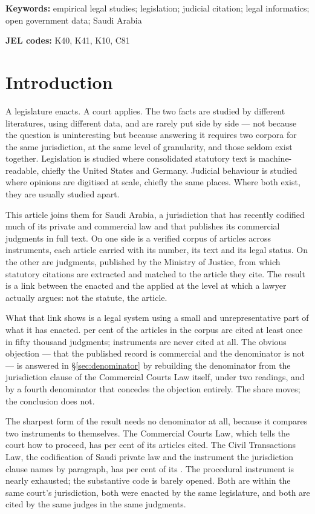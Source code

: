 \documentclass[11pt]{article}
\begin{document}
\noindent\textbf{Keywords:} empirical legal studies; legislation; judicial
citation; legal informatics; open government data; Saudi Arabia

\smallskip
\noindent\textbf{JEL codes:} K40, K41, K10, C81

\section{Introduction}

A legislature enacts. A court applies. The two facts are studied by different
literatures, using different data, and are rarely put side by side --- not
because the question is uninteresting but because answering it requires two
corpora for the same jurisdiction, at the same level of granularity, and
those seldom exist together. Legislation is studied where consolidated
statutory text is machine-readable, chiefly the United States and Germany.
Judicial behaviour is studied where opinions are digitised at scale, chiefly
the same places. Where both exist, they are usually studied apart.

This article joins them for Saudi Arabia, a jurisdiction that has recently
codified much of its private and commercial law and that publishes its
commercial judgments in full text. On one side is a verified corpus of
\nRegistryArticles{} articles across \nInstruments{} instruments, each
article carried with its number, its text and its legal status. On the other
are \nJudgments{} judgments, published by the Ministry of Justice, from which
\nCitations{} statutory citations are extracted and matched to the article
they cite. The result is a link between the enacted and the applied at the
level at which a lawyer actually argues: not the statute, the article.

What that link shows is a legal system using a small and unrepresentative
part of what it has enacted. \nArticlesCitedShare{} per cent of the articles
in the corpus are cited at least once in fifty thousand judgments;
\nInstrumentsNever{} instruments are never cited at all. The obvious
objection --- that the published record is commercial and the denominator is
not --- is answered in §\ref{sec:denominator} by rebuilding the denominator
from the jurisdiction clause of the Commercial Courts Law itself, under two
readings, and by a fourth denominator that concedes the objection entirely.
The share moves; the conclusion does not.

The sharpest form of the result needs no denominator at all, because it
compares two instruments to themselves. The Commercial Courts Law, which
tells the court how to proceed, has \nCCLShare{} per cent of its articles
cited. The Civil Transactions Law, the codification of Saudi private law and
the instrument the jurisdiction clause names by paragraph, has
\nCivilShare{} per cent of its \nCivilArticles{}. The procedural instrument
is nearly exhausted; the substantive code is barely opened. Both are within
the same court's jurisdiction, both were enacted by the same legislature, and
both are cited by the same judges in the same judgments.
\end{document}
